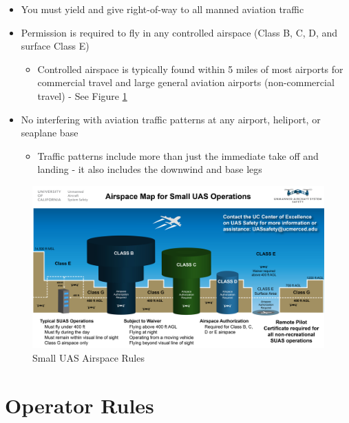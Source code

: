 \documentclass[
]{book}
\providecommand{\tightlist}{%
  \setlength{\itemsep}{0pt}\setlength{\parskip}{0pt}}
\begin{document}
\begin{itemize}
\tightlist
\item
  You must yield and give right-of-way to all manned aviation traffic
\item
  Permission is required to fly in any controlled airspace (Class B, C, D, and surface Class E)

  \begin{itemize}
  \tightlist
  \item
    Controlled airspace is typically found within 5 miles of most airports for commercial travel and large general aviation airports (non-commercial travel) - See Figure \ref{fig:SUAS-airspace-regs}
  \end{itemize}
\item
  No interfering with aviation traffic patterns at any airport, heliport, or seaplane base

  \begin{itemize}
  \tightlist
  \item
    Traffic patterns include more than just the immediate take off and landing - it also includes the downwind and base legs
  \end{itemize}
\end{itemize}

\begin{figure}

{\centering \includegraphics[width=0.9\linewidth]{images/SUAS_airspace_map} 

}

\caption{Small UAS Airspace Rules}\label{fig:SUAS-airspace-regs}
\end{figure}

\hypertarget{operator-rules}{%
\section{Operator Rules}\label{operator-rules}}
\end{document}
